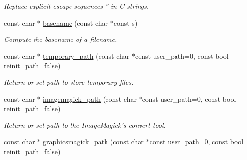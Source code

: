 \begin{DoxyCompactItemize}
\begin{DoxyCompactList}\small\item\em Replace explicit escape sequences '' in C-\/strings. \item\end{DoxyCompactList}\item 
\hypertarget{namespacecimg__library_1_1cimg_abc491a5ed3a8d97e395138a379767a45}{
const char $\ast$ \hyperlink{namespacecimg__library_1_1cimg_abc491a5ed3a8d97e395138a379767a45}{basename} (const char $\ast$const s)}
\label{namespacecimg__library_1_1cimg_abc491a5ed3a8d97e395138a379767a45}

\begin{DoxyCompactList}\small\item\em Compute the basename of a filename. \item\end{DoxyCompactList}\item 
\hypertarget{namespacecimg__library_1_1cimg_a797797a309ca40aa28cdfbb92f4d1621}{
const char $\ast$ \hyperlink{namespacecimg__library_1_1cimg_a797797a309ca40aa28cdfbb92f4d1621}{temporary\_\-path} (const char $\ast$const user\_\-path=0, const bool reinit\_\-path=false)}
\label{namespacecimg__library_1_1cimg_a797797a309ca40aa28cdfbb92f4d1621}

\begin{DoxyCompactList}\small\item\em Return or set path to store temporary files. \item\end{DoxyCompactList}\item 
\hypertarget{namespacecimg__library_1_1cimg_ad0db1003e37cc111d9eddd282c1ab27b}{
const char $\ast$ \hyperlink{namespacecimg__library_1_1cimg_ad0db1003e37cc111d9eddd282c1ab27b}{imagemagick\_\-path} (const char $\ast$const user\_\-path=0, const bool reinit\_\-path=false)}
\label{namespacecimg__library_1_1cimg_ad0db1003e37cc111d9eddd282c1ab27b}

\begin{DoxyCompactList}\small\item\em Return or set path to the ImageMagick's {\ttfamily convert} tool. \item\end{DoxyCompactList}\item 
\hypertarget{namespacecimg__library_1_1cimg_aa9f7e166f51b43facc8ecc9f05e4ceba}{
const char $\ast$ \hyperlink{namespacecimg__library_1_1cimg_aa9f7e166f51b43facc8ecc9f05e4ceba}{graphicsmagick\_\-path} (const char $\ast$const user\_\-path=0, const bool reinit\_\-path=false)}
\label{namespacecimg__library_1_1cimg_aa9f7e166f51b43facc8ecc9f05e4ceba}


\end{DoxyCompactItemize}
